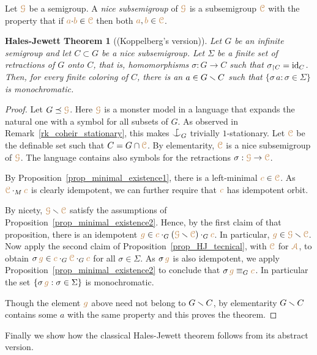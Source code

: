 \documentclass[creche.tex]{subfiles}
\begin{document}
Let ${\color{brown}\EuScript G}$ be a semigroup.
A \emph{nice subsemigroup\/} of ${\color{brown}\EuScript G}$ is a subsemigroup ${\color{brown}\EuScript C}$ with the property that if ${\color{brown} a}{\cdot}{\color{brown} b}\in{\color{brown}\EuScript C}$ then both ${\color{brown} a},{\color{brown} b}\in {\color{brown}\EuScript C}$.

\theoremstyle{mio}
\newtheorem{HalesJewett}[thm]{Hales-Jewett Theorem}
\begin{HalesJewett}[(Koppelberg's version)]\label{thm_abstract_HJ}
Let $G$ be an infinite semigroup and let $C\subset G$ be a nice subsemigroup.
Let $\Sigma$ be a finite set of retractions of $G$ onto $C$, that is, 
homomorphisms $\sigma:G\to C$ such that $\sigma_{\restriction C}={\rm id}_C$.
Then, for every finite coloring of $C$,
there is an $a\in G\smallsetminus C$ such that $\{\sigma\,a:\sigma\in\Sigma\}$ is monochromatic.
\end{HalesJewett}

\begin{proof}
Let $G\preceq{\color{brown}\EuScript G}$.
Here ${\color{brown}\EuScript G}$ is a monster model in a language that expands the natural one with a symbol for all subsets of $G$.
As observed in Remark~\ref{rk_coheir_stationary}, 
this makes $\nonforkc_G$ trivially $1$-stationary.
Let ${\color{brown}\EuScript C}$ be the definable set such that $C=G\cap{\color{brown}\EuScript C}$.
By elementarity, ${\color{brown}\EuScript C}$ is a nice subsemigroup of ${\color{brown}\EuScript G}$.
The language contains also symbols for 
the retractions $\sigma:{\color{brown}\EuScript G}\to{\color{brown}\EuScript C}$.

By Proposition~\ref{prop_minimal_existence1}, there is a left-minimal ${\color{brown} c}\in{\color{brown}\EuScript C}$.
As ${\color{brown}\EuScript C}\cdot_M{\color{brown} c}$ is clearly idempotent, we can further require that ${\color{brown} c}$ has idempotent orbit.

By nicety, ${\color{brown}\EuScript G}\smallsetminus{\color{brown}\EuScript C}$ satisfy the assumptions of 
Proposition~\ref{prop_minimal_existence2}.
%
Hence, by the first claim of that proposition, there is an idempotent
${\color{brown} g}\in{\color{brown}c}\cdot_G({\color{brown}\EuScript G}\smallsetminus{\color{brown}\EuScript C})\cdot_G{\color{brown} c}$.
%
In particular, ${\color{brown} g}\in{\color{brown}\EuScript G}\smallsetminus{\color{brown}\EuScript C}$.
%
Now apply the second claim of Proposition~\ref{prop_HJ_tecnical},
with ${\color{brown}\EuScript C}$ for ${\color{brown}\EuScript A}$, to  obtain 
$\sigma\,{\color{brown} g}\in{\color{brown}c}\cdot_G{\color{brown}\EuScript C}\cdot_G{\color{brown} c}$ 
for all $\sigma\in\Sigma$.
%
As $\sigma\,{\color{brown} g}$ is also idempotent, we apply 
Proposition~\ref{prop_minimal_existence2} to conclude that 
$\sigma\,{\color{brown} g}\equiv_G{\color{brown} c}$.
%
In particular the set $\{\sigma\,{\color{brown} g}:\sigma\in\Sigma\}$ is monochromatic.

Though the element ${\color{brown} g}$ above need not belong to $G\smallsetminus C$,
by elementarity $G\smallsetminus C$ contains some $a$ with the same property and 
this proves the theorem.
\end{proof}

Finally we show how the classical Hales-Jewett theorem follows from its abstract version.
\end{document}

